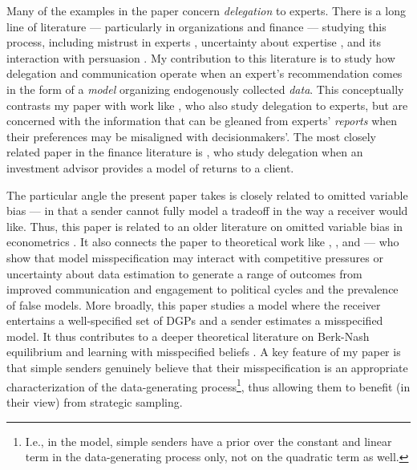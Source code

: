 \documentclass[11pt,dvipsnames]{article}
\begin{document}
Many of the examples in the paper concern \emph{delegation} to experts.
There is a long line of literature --- particularly in organizations and finance --- studying this process, including mistrust in experts \citep{cheng2022distrust}, uncertainty about expertise \citep{kishishita2020not}, and its interaction with persuasion \citep{kolotilin2025persuasion}.
My contribution to this literature is to study how delegation and communication operate when an expert's recommendation comes in the form of a \emph{model} organizing endogenously collected \emph{data}.
This conceptually contrasts my paper with work like \citet{deimen2019delegated}, who also study delegation to experts, but are concerned with the information that can be gleaned from experts' \emph{reports} when their preferences may be misaligned with decisionmakers'.
The most closely related paper in the finance literature is \citet{li2018delegation}, who study delegation when an investment advisor provides a model of returns to a client.

The particular angle the present paper takes is closely related to omitted variable bias --- in that a sender cannot fully model a tradeoff in the way a receiver would like.
Thus, this paper is related to an older literature on omitted variable bias in econometrics \citep[see][and references therein]{theil1957specification, altonji2005selection, oster2019unobservable}.
It also connects the paper to theoretical work like \citet{levy2022misspecified}, \citet{gleyze2022value}, and \citet{eliaz2025false} --- who show that model misspecification may interact with competitive pressures or uncertainty about data estimation to generate a range of outcomes from improved communication and engagement to political cycles and the prevalence of false models.
More broadly, this paper studies a model where the receiver entertains a well-specified set of DGPs and a sender estimates a misspecified model.
It thus contributes to a deeper theoretical literature on Berk-Nash equilibrium and learning with misspecified beliefs \citep{alonso2016bayesian, esponda2016berk, spiegler2016bayesian, heidhues2018unrealistic, mailath2020learning, bohren2021learning,fudenberg2021limit,de2022non,levy2022persuasion,bohren2025misspecified}.
A key feature of my paper is that simple senders genuinely believe that their misspecification is an appropriate characterization of the data-generating process\footnote{I.e., in the model, simple senders have a prior over the constant and linear term in the data-generating process only, not on the quadratic term as well.}, thus allowing them to benefit (in their view) from strategic sampling.
\end{document}
